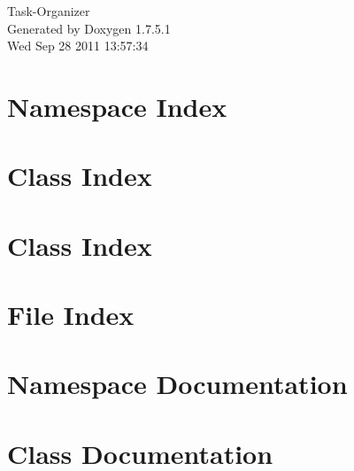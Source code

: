 \documentclass[a4paper]{book}
\begin{document}
\hypersetup{pageanchor=false,citecolor=blue}
\begin{titlepage}
\vspace*{7cm}
\begin{center}
{\Large \-Task-\/\-Organizer }\\
\vspace*{1cm}
{\large \-Generated by Doxygen 1.7.5.1}\\
\vspace*{0.5cm}
{\small Wed Sep 28 2011 13:57:34}\\
\end{center}
\end{titlepage}
\clearemptydoublepage
{}
\tableofcontents
\clearemptydoublepage
{}
\hypersetup{pageanchor=true,citecolor=blue}
\chapter{\-Namespace \-Index}

\chapter{\-Class \-Index}

\chapter{\-Class \-Index}

\chapter{\-File \-Index}

\chapter{\-Namespace \-Documentation}










\chapter{\-Class \-Documentation}























\end{document}

